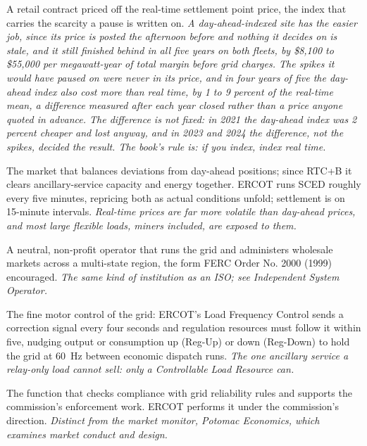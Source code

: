 \begin{description}[leftmargin=0pt,style=unboxed,itemsep=0.35em,parsep=0.15em]
\item[real-time index] \hypertarget{glossary:real-time-index}{}A retail contract priced off the real-time settlement point price, the index that carries the scarcity a pause is written on. \emph{A day-ahead-indexed site has the easier job, since its price is posted the afternoon before and nothing it decides on is stale, and it still finished behind in all five years on both fleets, by \$8,100 to \$55,000 per megawatt-year of total margin before grid charges. The spikes it would have paused on were never in its price, and in four years of five the day-ahead index also cost more than real time, by 1 to 9 percent of the real-time mean, a difference measured after each year closed rather than a price anyone quoted in advance. The difference is not fixed: in 2021 the day-ahead index was 2 percent cheaper and lost anyway, and in 2023 and 2024 the difference, not the spikes, decided the result. The book's rule is: if you index, index real time.}
\item[Real-Time Market (RTM)] \hypertarget{glossary:real-time-market}{}The market that balances deviations from day-ahead positions; since RTC+B it clears ancillary-service capacity and energy together. ERCOT runs SCED roughly every five minutes, repricing both as actual conditions unfold; settlement is on 15-minute intervals. \emph{Real-time prices are far more volatile than day-ahead prices, and most large flexible loads, miners included, are exposed to them.}
\item[Regional Transmission Organization (RTO)] \hypertarget{glossary:regional-transmission-organization}{}A neutral, non-profit operator that runs the grid and administers wholesale markets across a multi-state region, the form FERC Order No. 2000 (1999) encouraged. \emph{The same kind of institution as an ISO; see Independent System Operator.}
\item[Regulation (Reg-Up, Reg-Down)] \hypertarget{glossary:regulation}{}The fine motor control of the grid: ERCOT's Load Frequency Control sends a correction signal every four seconds and regulation resources must follow it within five, nudging output or consumption up (Reg-Up) or down (Reg-Down) to hold the grid at 60~Hz between economic dispatch runs. \emph{The one ancillary service a relay-only load cannot sell: only a Controllable Load Resource can.}
\item[reliability monitor] \hypertarget{glossary:reliability-monitor}{}The function that checks compliance with grid reliability rules and supports the commission's enforcement work. ERCOT performs it under the commission's direction. \emph{Distinct from the market monitor, Potomac Economics, which examines market conduct and design.}

\end{description}
